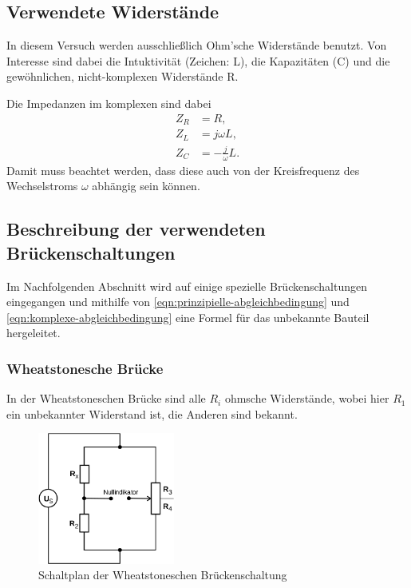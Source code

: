\subsection{Verwendete Widerstände}
\label{seq:widerstände}
In diesem Versuch werden ausschließlich Ohm'sche Widerstände benutzt. Von Interesse sind dabei
die Intuktivität (Zeichen: L), die Kapazitäten (C) und die gewöhnlichen, nicht-komplexen 
Widerstände R.

Die Impedanzen im komplexen sind dabei
\begin{align}
	Z_R &= R, \\
	Z_L &= j\omega L, \\
	Z_C &= -\frac{j}{\omega} L.
	\label{eqn:impedanzen}
\end{align}
Damit muss beachtet werden, dass diese auch von der Kreisfrequenz des Wechselstroms $\omega$ 
abhängig sein können. 

\subsection{Beschreibung der verwendeten Brückenschaltungen}
\label{sec:spezielle-Schaltungen}

Im Nachfolgenden Abschnitt wird auf einige spezielle Brückenschaltungen eingegangen und mithilfe von
\autoref{eqn:prinzipielle-abgleichbedingung} und \autoref{eqn:komplexe-abgleichbedingung} 
eine Formel für das unbekannte Bauteil hergeleitet.

\subsubsection{Wheatstonesche Brücke}
\label{sec:theorie-wheatstone}
In der Wheatstoneschen Brücke sind alle $R_i$ ohmsche Widerstände, wobei hier $R_1$ ein unbekannter
Widerstand ist, die Anderen sind bekannt.

\begin{figure}[H]
	\centering
	\includegraphics[width=0.4\textwidth]{bilder/wheatstone.png}
	\caption{Schaltplan der Wheatstoneschen Brückenschaltung}
	\label{fig:wheatstone-bruecke}
\end{figure}

